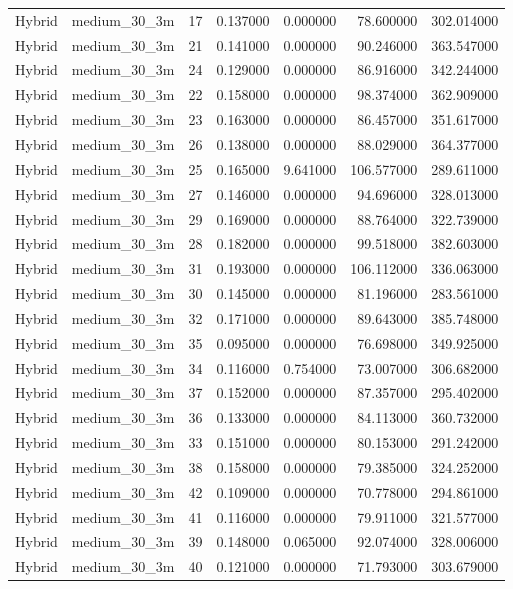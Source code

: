 \begin{tabular}{llrrrrr}
Hybrid & medium_30_3m & 17 & 0.137000 & 0.000000 & 78.600000 & 302.014000 \\
Hybrid & medium_30_3m & 21 & 0.141000 & 0.000000 & 90.246000 & 363.547000 \\
Hybrid & medium_30_3m & 24 & 0.129000 & 0.000000 & 86.916000 & 342.244000 \\
Hybrid & medium_30_3m & 22 & 0.158000 & 0.000000 & 98.374000 & 362.909000 \\
Hybrid & medium_30_3m & 23 & 0.163000 & 0.000000 & 86.457000 & 351.617000 \\
Hybrid & medium_30_3m & 26 & 0.138000 & 0.000000 & 88.029000 & 364.377000 \\
Hybrid & medium_30_3m & 25 & 0.165000 & 9.641000 & 106.577000 & 289.611000 \\
Hybrid & medium_30_3m & 27 & 0.146000 & 0.000000 & 94.696000 & 328.013000 \\
Hybrid & medium_30_3m & 29 & 0.169000 & 0.000000 & 88.764000 & 322.739000 \\
Hybrid & medium_30_3m & 28 & 0.182000 & 0.000000 & 99.518000 & 382.603000 \\
Hybrid & medium_30_3m & 31 & 0.193000 & 0.000000 & 106.112000 & 336.063000 \\
Hybrid & medium_30_3m & 30 & 0.145000 & 0.000000 & 81.196000 & 283.561000 \\
Hybrid & medium_30_3m & 32 & 0.171000 & 0.000000 & 89.643000 & 385.748000 \\
Hybrid & medium_30_3m & 35 & 0.095000 & 0.000000 & 76.698000 & 349.925000 \\
Hybrid & medium_30_3m & 34 & 0.116000 & 0.754000 & 73.007000 & 306.682000 \\
Hybrid & medium_30_3m & 37 & 0.152000 & 0.000000 & 87.357000 & 295.402000 \\
Hybrid & medium_30_3m & 36 & 0.133000 & 0.000000 & 84.113000 & 360.732000 \\
Hybrid & medium_30_3m & 33 & 0.151000 & 0.000000 & 80.153000 & 291.242000 \\
Hybrid & medium_30_3m & 38 & 0.158000 & 0.000000 & 79.385000 & 324.252000 \\
Hybrid & medium_30_3m & 42 & 0.109000 & 0.000000 & 70.778000 & 294.861000 \\
Hybrid & medium_30_3m & 41 & 0.116000 & 0.000000 & 79.911000 & 321.577000 \\
Hybrid & medium_30_3m & 39 & 0.148000 & 0.065000 & 92.074000 & 328.006000 \\
Hybrid & medium_30_3m & 40 & 0.121000 & 0.000000 & 71.793000 & 303.679000 \\

\end{tabular}
